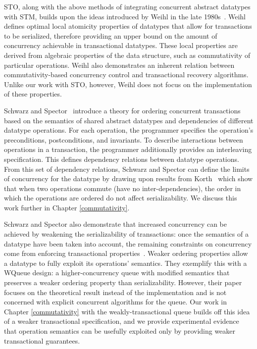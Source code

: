 STO, along with the above methods of integrating concurrent abstract datatypes with STM, builds upon the ideas introduced by Weihl in the late 1980s~\cite{weihl}. Weihl defines optimal local atomicity properties of datatypes that allow for transactions to be serialized, therefore providing an upper bound on the amount of concurrency achievable in transactional datatypes. These local properties are derived from algebraic properties of the data structure, such as commutativity of particular operations. Weihl also demonstrates an inherent relation between commutativity-based concurrency control and transactional recovery algorithms. Unlike our work with STO, however, Weihl does not focus on the implementation of these properties.

Schwarz and Spector~\cite{schwarz} introduce a theory for ordering concurrent transactions based on the semantics of shared abstract datatypes and dependencies of different datatype operations. For each operation, the programmer specifies the operation's preconditions, postconditions, and invariants. To describe interactions between operations in a transaction, the programmer additionally provides an interleaving specification. This defines dependency relations between datatype operations. From this set of dependency relations, Schwarz and Spector can define the limits of concurrency for the datatype by drawing upon results from Korth~\cite{korth} which show that when two operations commute (have no inter-dependencies), the order in which the operations are ordered do not affect serializability. We discuss this work further in Chapter \ref{commutativity}. 

Schwarz and Spector also demonstrate that increased concurrency can be achieved by weakening the serializability of transactions: once the semantics of a datatype have been taken into account, the remaining constraints on concurrency come from enforcing transactional properties~\cite{kung}. Weaker ordering properties allow a datatype to fully exploit its operations' semantics. They exemplify this with a WQueue design: a higher-concurrency queue with modified semantics that preserves a weaker ordering property than serializability. However, their paper focuses on the theoretical result instead of the implementation and is not concerned with explicit concurrent algorithms for the queue. Our work in Chapter \ref{commutativity} with the weakly-transactional queue builds off this idea of a weaker transactional specification, and we provide experimental evidence that operation semantics can be usefully exploited only by providing weaker transactional guarantees.

